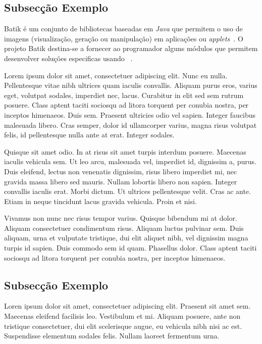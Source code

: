 \subsection{Subsecção Exemplo} \label{batik} 

Batik é um conjunto de bibliotecas baseadas em \textit{Java} que
permitem o uso de imagens \svg{} (visualização, geração ou
manipulação) em aplicações ou \textit{applets}~\citep{kn:batik}.  
O projeto Batik destina-se a fornecer ao programador
alguns módulos que permitem desenvolver soluções especificas usando
\svg~\citep{kn:svgdoc}. 

Lorem ipsum dolor sit amet, consectetuer adipiscing elit. Nunc eu
nulla. Pellentesque vitae nibh ultrices quam iaculis
convallis. Aliquam purus eros, varius eget, volutpat sodales,
imperdiet nec, lacus. Curabitur in elit sed sem rutrum posuere. Class
aptent taciti sociosqu ad litora torquent per conubia nostra, per
inceptos himenaeos. Duis sem. Praesent ultricies odio vel
sapien. Integer faucibus malesuada libero. Cras semper, dolor id
ullamcorper varius, magna risus volutpat felis, id pellentesque nulla
ante at erat. Integer sodales. 

Quisque sit amet odio. In at risus sit amet turpis interdum
posuere. Maecenas iaculis vehicula sem. Ut leo arcu, malesuada vel,
imperdiet id, dignissim a, purus. Duis eleifend, lectus non venenatis
dignissim, risus libero imperdiet mi, nec gravida massa libero sed
mauris. Nullam lobortis libero non sapien. Integer convallis iaculis
erat. Morbi dictum. Ut ultrices pellentesque velit. Cras ac
ante. Etiam in neque tincidunt lacus gravida vehicula. Proin et nisi. 

Vivamus non nunc nec risus tempor varius. Quisque bibendum mi at
dolor. Aliquam consectetuer condimentum risus. Aliquam luctus pulvinar
sem. Duis aliquam, urna et vulputate tristique, dui elit aliquet nibh,
vel dignissim magna turpis id sapien. Duis commodo sem id
quam. Phasellus dolor. Class aptent taciti sociosqu ad litora torquent
per conubia nostra, per inceptos himenaeos. 

\subsection{Subsecção Exemplo}

Loren ipsum dolor sit amet, consectetuer adipiscing elit. 
Praesent sit amet sem. Maecenas eleifend facilisis leo. Vestibulum et
mi. Aliquam posuere, ante non tristique consectetuer, dui elit
scelerisque augue, eu vehicula nibh nisi ac est. Suspendisse elementum
sodales felis. Nullam laoreet fermentum urna. 

